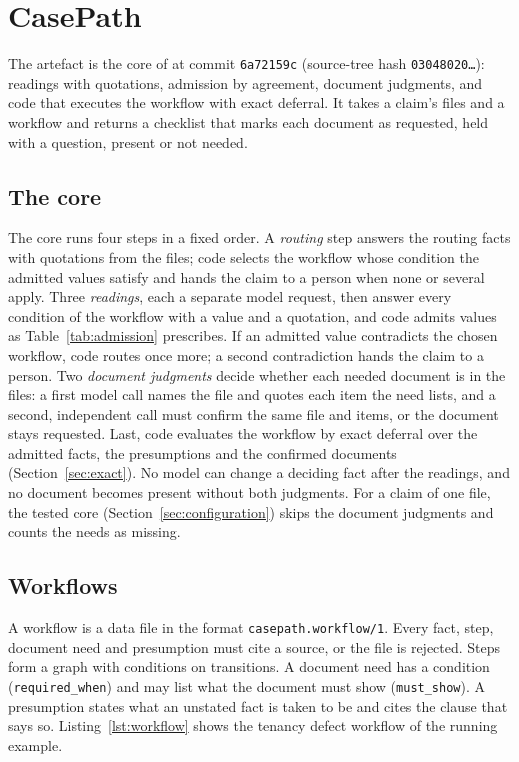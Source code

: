 \section{CasePath}
\label{sec:casepath}

The artefact is the core of \casepath at commit \texttt{6a72159c} (source-tree hash \texttt{03048020\ldots}): readings with quotations, admission by agreement, document judgments, and code that executes the workflow with exact deferral. It takes a claim's files and a workflow and returns a checklist that marks each document as requested, held with a question, present or not needed.

\subsection{The core}
\label{sec:pipeline}

The core runs four steps in a fixed order. A \emph{routing} step answers the routing facts with quotations from the files; code selects the workflow whose condition the admitted values satisfy and hands the claim to a person when none or several apply. Three \emph{readings}, each a separate model request, then answer every condition of the workflow with a value and a quotation, and code admits values as Table~\ref{tab:admission} prescribes. If an admitted value contradicts the chosen workflow, code routes once more; a second contradiction hands the claim to a person. Two \emph{document judgments} decide whether each needed document is in the files: a first model call names the file and quotes each item the need lists, and a second, independent call must confirm the same file and items, or the document stays requested. Last, code evaluates the workflow by exact deferral over the admitted facts, the presumptions and the confirmed documents (Section~\ref{sec:exact}). No model can change a deciding fact after the readings, and no document becomes present without both judgments. For a claim of one file, the tested core (Section~\ref{sec:configuration}) skips the document judgments and counts the needs as missing.

\subsection{Workflows}
\label{sec:format}

A workflow is a data file in the format \texttt{casepath.workflow/\allowbreak{}1}. Every fact, step, document need and presumption must cite a source, or the file is rejected. Steps form a graph with conditions on transitions. A document need has a condition (\texttt{required\_\allowbreak{}when}) and may list what the document must show (\texttt{must\_show}). A presumption states what an unstated fact is taken to be and cites the clause that says so. Listing~\ref{lst:workflow} shows the tenancy defect workflow of the running example.

